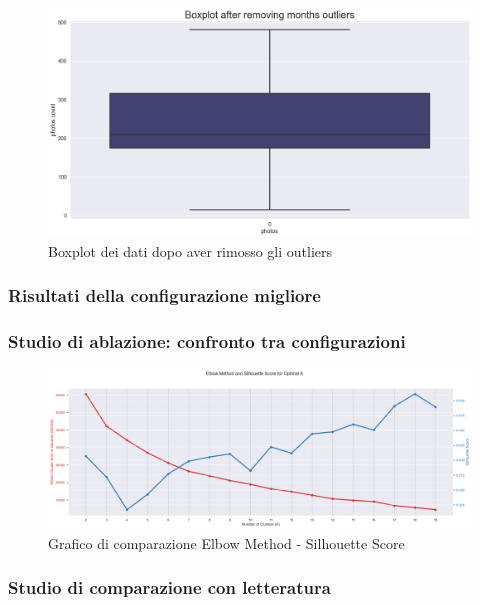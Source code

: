 \documentclass[12pt,a4paper,twoside]{article}
\begin{document}
\begin{figure}[h!]
    \centering
    \includegraphics[width=\textwidth ,height=\textheight, keepaspectratio]{assets/boxplot-wout-outliers.png}
    \caption{Boxplot dei dati dopo aver rimosso gli outliers}
    \label{fig:boxplot-wout-outliers}
\end{figure}


\subsubsection{Risultati della configurazione migliore}
\subsubsection{Studio di ablazione: confronto tra configurazioni}
\begin{figure}[h!]
    \centering
    \includegraphics[width=\textwidth ,height=\textheight, keepaspectratio]{assets/elbow-silhouette.png}
    \caption{Grafico di comparazione Elbow Method - Silhouette Score}
    \label{fig:elbow-silhouette}
\end{figure}
\subsubsection{Studio di comparazione con letteratura}
\end{document}
